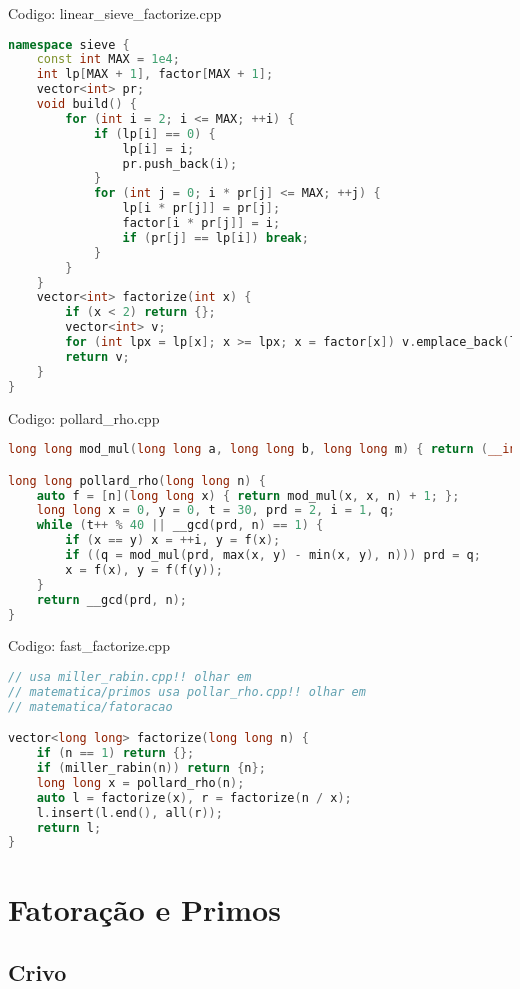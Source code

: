 \documentclass[10pt, a4paper, oneside]{book}
\begin{document}
Codigo: linear\_sieve\_factorize.cpp

\begin{lstlisting}[language=C++]
namespace sieve {
    const int MAX = 1e4;
    int lp[MAX + 1], factor[MAX + 1];
    vector<int> pr;
    void build() {
        for (int i = 2; i <= MAX; ++i) {
            if (lp[i] == 0) {
                lp[i] = i;
                pr.push_back(i);
            }
            for (int j = 0; i * pr[j] <= MAX; ++j) {
                lp[i * pr[j]] = pr[j];
                factor[i * pr[j]] = i;
                if (pr[j] == lp[i]) break;
            }
        }
    }
    vector<int> factorize(int x) {
        if (x < 2) return {};
        vector<int> v;
        for (int lpx = lp[x]; x >= lpx; x = factor[x]) v.emplace_back(lp[x]);
        return v;
    }
}
\end{lstlisting}
\hfill

Codigo: pollard\_rho.cpp

\begin{lstlisting}[language=C++]
long long mod_mul(long long a, long long b, long long m) { return (__int128)a * b % m; }

long long pollard_rho(long long n) {
    auto f = [n](long long x) { return mod_mul(x, x, n) + 1; };
    long long x = 0, y = 0, t = 30, prd = 2, i = 1, q;
    while (t++ % 40 || __gcd(prd, n) == 1) {
        if (x == y) x = ++i, y = f(x);
        if ((q = mod_mul(prd, max(x, y) - min(x, y), n))) prd = q;
        x = f(x), y = f(f(y));
    }
    return __gcd(prd, n);
}
\end{lstlisting}
\hfill

Codigo: fast\_factorize.cpp

\begin{lstlisting}[language=C++]
// usa miller_rabin.cpp!! olhar em
// matematica/primos usa pollar_rho.cpp!! olhar em
// matematica/fatoracao

vector<long long> factorize(long long n) {
    if (n == 1) return {};
    if (miller_rabin(n)) return {n};
    long long x = pollard_rho(n);
    auto l = factorize(x), r = factorize(n / x);
    l.insert(l.end(), all(r));
    return l;
}
\end{lstlisting}
\hfill

\section{Fatoração e Primos}
\subsection{Crivo}
\end{document}
